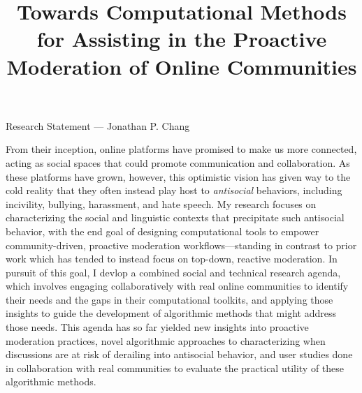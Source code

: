 \documentclass[11pt,letterpaper]{article}
\title{Towards Computational Methods for Assisting in the Proactive Moderation of Online Communities}
\begin{document}
\maketitle

\begin{center}
Research Statement --- Jonathan P. Chang
\end{center}

From their inception, online platforms have promised to make us more connected, acting as social spaces that could promote communication and collaboration. 
As these platforms have grown, however, this optimistic vision has given way to the cold reality that they often instead play host to \emph{antisocial} behaviors, including incivility, bullying, harassment, and hate speech. 
%
My research focuses on characterizing the social and linguistic contexts that precipitate such antisocial behavior, with the end goal of designing computational tools to empower community-driven, proactive moderation workflows---standing in contrast to prior work which has tended to instead focus on top-down, reactive moderation.
In pursuit of this goal, I devlop a combined social and technical research agenda, which involves engaging collaboratively with real online communities to identify their needs and the gaps in their computational toolkits, and applying those insights to guide the development of algorithmic methods that might address those needs.
This agenda has so far yielded new insights into proactive moderation practices, novel algorithmic approaches to characterizing when discussions are at risk of derailing into antisocial behavior, and user studies done in collaboration with real communities to evaluate the practical utility of these algorithmic methods.
\end{document}
